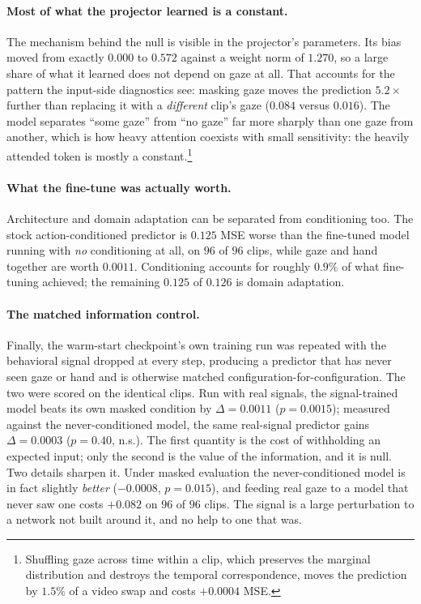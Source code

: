 \paragraph{Most of what the projector learned is a constant.}
The mechanism behind the null is visible in the projector's parameters. Its bias
moved from exactly $0.000$ to $0.572$ against a weight norm of $1.270$, so a large
share of what it learned does not depend on gaze at all. That accounts for the pattern the
input-side diagnostics see: masking gaze moves the
prediction $5.2\times$ further than replacing it with a \emph{different} clip's
gaze ($0.084$ versus $0.016$). The model separates ``some gaze'' from ``no gaze''
far more sharply than one gaze from another, which is how heavy attention
coexists with small sensitivity: the heavily attended token is mostly a constant.\footnote{Shuffling gaze across time within a clip, which preserves the
marginal distribution and destroys the temporal correspondence, moves the
prediction by $1.5\%$ of a video swap and costs $+0.0004$ MSE.}

\paragraph{What the fine-tune was actually worth.}
Architecture and domain adaptation can be separated from conditioning too. The
stock action-conditioned predictor is $0.125$ MSE worse than the fine-tuned model
running with \emph{no} conditioning at all, on $96$ of $96$ clips, while gaze and
hand together are worth $0.0011$. Conditioning accounts for roughly $0.9\%$ of
what fine-tuning achieved; the remaining $0.125$ of $0.126$ is domain adaptation.

\paragraph{The matched information control.}
Finally, the warm-start checkpoint's own training run was repeated with the
behavioral signal dropped at every step, producing a predictor that has never
seen gaze or hand and is otherwise matched configuration-for-configuration. The
two were scored on the identical clips. Run with real signals, the signal-trained
model beats its own
masked condition by $\Delta = 0.0011$ ($p = 0.0015$); measured against the
never-conditioned model, the same real-signal predictor gains
$\Delta = 0.0003$ ($p = 0.40$, n.s.). The first quantity is the cost of
withholding an expected input; only the second is the value of the information,
and it is null. Two details sharpen it. Under masked evaluation the
never-conditioned model is in fact slightly \emph{better} ($-0.0008$,
$p = 0.015$), and feeding real gaze to a model that never saw one costs $+0.082$
on $96$ of $96$ clips. The signal is a large perturbation to a network not built
around it, and no help to one that was.

